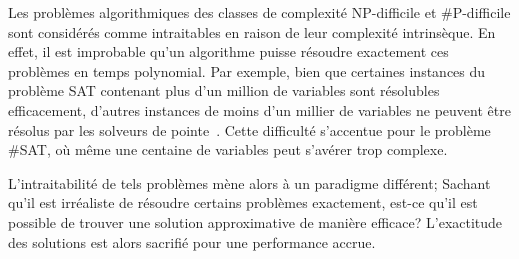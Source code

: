 Les problèmes algorithmiques des classes de complexité \textsf{NP}-difficile et \textsf{\#P}-difficile sont considérés comme intraitables en raison de leur complexité intrinsèque. En effet, il est improbable qu'un algorithme puisse résoudre exactement ces problèmes en temps polynomial. Par exemple, bien que certaines instances du problème SAT contenant plus d'un million de variables sont résolubles efficacement, d'autres instances de moins d'un millier de variables ne peuvent être résolus par les solveurs de pointe~\cite{froleyksSATCompetition20202021}. Cette difficulté s'accentue pour le problème \#SAT, où même une centaine de variables peut s'avérer trop complexe. 

L'intraitabilité de tels problèmes mène alors à un paradigme différent; Sachant qu'il est irréaliste de résoudre certains problèmes exactement, est-ce qu'il est possible de trouver une solution approximative de manière efficace? L'exactitude des solutions est alors sacrifié pour une performance accrue.

